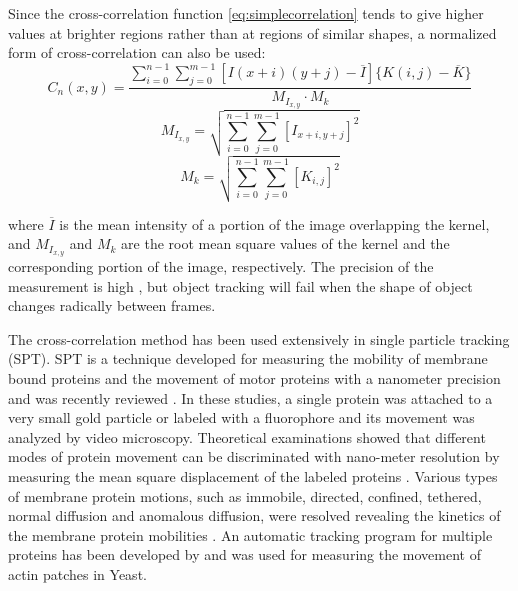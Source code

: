 Since the cross-correlation function \ref{eq:simplecorrelation} tends to give higher values at
brighter regions rather than at regions of similar shapes, a normalized
form of cross-correlation can also be used:
\begin{equation}
C_{n}(x,y)=\frac{\sum_{i=0}^{n-1}\sum_{j=0}^{m-1}[I(x+i)(y+j)-\overline{I}]\{K(i,j)-\overline{K}\}}{M_{I_{x,y}}\cdot M_{k}}
\end{equation}
\begin{equation}
M_{I_{x,y}}=\sqrt{\sum_{i=0}^{n-1}\sum_{j=0}^{m-1}[I_{x+i,y+j}]^{2}}
\end{equation}
\begin{equation}
M_{k}=\sqrt{\sum_{i=0}^{n-1}\sum_{j=0}^{m-1}[K_{i,j}]^{2}}
\end{equation}

where 
$\overline{I}$ is the mean intensity of a portion of the image overlapping the kernel,
and $M_{I_{x,y}}$ and
$M_{k}$ are the root mean square values of
the kernel and the corresponding portion of the image, respectively.
The precision of the measurement is high \citep{cheezumBJ2001}, but
object tracking will fail when the shape of object changes radically
between frames. 

The cross-correlation method has been used extensively in single
particle tracking (SPT). SPT is a technique developed for measuring the
mobility of membrane bound proteins and the movement of motor proteins
with a nanometer precision \citep{gellesNAT1988, Geerts1987, schnappCMOT1988, sheetzNAT1989} and was recently reviewed
\citep{ritchieME2003}. In these studies, a single protein was attached
to a very small gold particle or labeled with a fluorophore and its
movement was analyzed by video microscopy. Theoretical examinations
showed that different modes of protein movement can be discriminated
with nano-meter resolution by measuring the mean square displacement of
the labeled proteins \citep{qianBJ1991}. Various types of membrane
protein motions, such as immobile, directed, confined, tethered, normal
diffusion and anomalous diffusion, were resolved revealing the kinetics
of the membrane protein mobilities \citep{kusumiBJ1993, saxtonBJ1997}.
An automatic tracking program for multiple proteins has been developed
by \citet*{ghoshBJ1994} and was used for measuring the movement of actin patches in Yeast\citep{calssonBJ2002}. 


